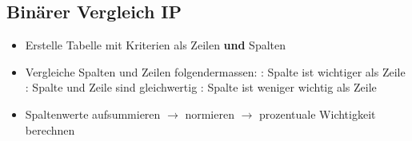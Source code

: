 \subsection{Binärer Vergleich \hfill IP}
\begin{scriptsize}
    \begin{itemize}
        \item Erstelle Tabelle mit Kriterien als Zeilen \textbf{und} Spalten
        \item Vergleiche Spalten und Zeilen folgendermassen:
        \subitem [2]: Spalte ist wichtiger als Zeile 
        \subitem [1]: Spalte und Zeile sind gleichwertig
        \subitem [0]: Spalte ist weniger wichtig als Zeile
        \item Spaltenwerte aufsummieren $\to$ normieren $\to$ prozentuale Wichtigkeit berechnen
    \end{itemize}
\end{scriptsize}